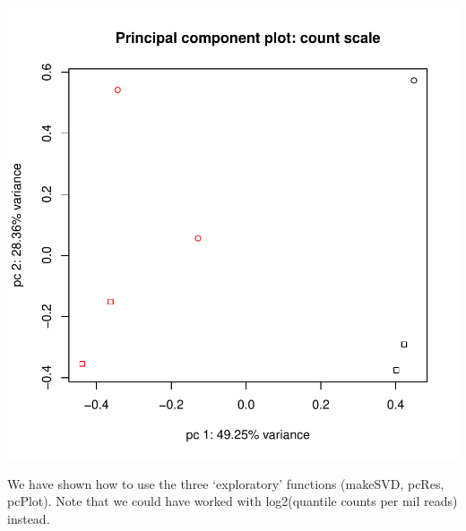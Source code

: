 \documentclass{article}
\begin{document}
\begin{itemize}
\includegraphics{batch_vignette-007}
\end{itemize}
We have shown how to use the three `exploratory' functions (makeSVD, pcRes, pcPlot). Note that 
we could have worked with log2(quantile counts per mil reads) instead.
% 
\end{document}
